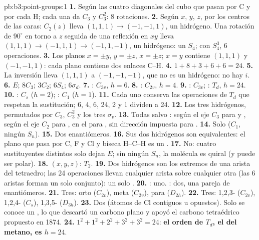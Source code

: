 \begin{solution}{pb:b3:point-groups:1}
\textbf{1.} Según las cuatro diagonales del cubo que pasan por C y por cada H; cada una da
$C_3$ y $C_3^2$: 8 rotaciones.
\textbf{2.} Según $x$, $y$, $z$, por los centros de las caras: $C_2(z)$ lleva $(1,1,1)
\to (-1,-1,1)$, un hidrógeno. Una rotación de $90^\circ$ en torno a $z$ seguida de una
reflexión en $xy$ lleva $(1,1,1) \to (-1,1,1) \to (-1,1,-1)$, un hidrógeno: un
$S_4$; con $S_4^3$, 6 operaciones.
\textbf{3.} Los planos $x = \pm y$, $y = \pm z$, $x = \pm z$; $x = y$ contiene
$(1,1,1)$ y $(-1,-1,1)$: cada plano contiene dos enlaces C--H.
\textbf{4.} $1 + 8 + 3 + 6 + 6 = 24$.
\textbf{5.} La inversión lleva $(1,1,1)$ a $(-1,-1,-1)$, que no es un hidrógeno:
no hay $i$.
\textbf{6.} $E$; $8C_3$; $3C_2$; $6S_4$; $6\sigma_d$.
\textbf{7.} : $C_{3v}$, $h = 6$.
\textbf{8.} : $C_{2v}$, $h = 4$.
\textbf{9.} : $C_{3v}$; : $T_d$, $h = 24$.
\textbf{10.} : $C_s$ ($h = 2$); : $C_1$ ($h = 1$).
\textbf{11.} Cada uno conserva las operaciones de $T_d$ que respetan la
sustitución; 6, 4, 6, 24, 2 y 1 dividen a 24.
\textbf{12.} Los tres hidrógenos, permutados por $C_3$, $C_3^2$ y los tres
$\sigma_v$.
\textbf{13.} Todas salvo : según el eje $C_3$ para  y ,
según el eje $C_2$ para , en el  para , sin
dirección impuesta para .
\textbf{14.} Solo  ($C_1$, ningún $S_n$).
\textbf{15.} Dos enantiómeros.
\textbf{16.} Sus dos hidrógenos son equivalentes: el plano que pasa por C, F y Cl
y biseca H--C--H es un .
\textbf{17.} No: cuatro sustituyentes distintos solo dejan $E$; sin ningún $S_n$, la
molécula es quiral (y puede ser polar).
\textbf{18.} $(x, y, z)$: $T_2$.
\textbf{19.} Dos hidrógenos son los extremos de una arista del tetraedro; las 24
operaciones llevan cualquier arista sobre cualquier otra (las 6 aristas forman un solo conjunto): un solo
.
\textbf{20.} : uno. : dos, una pareja de enantiómeros.
\textbf{21.} Tres: orto ($C_{2v}$), meta ($C_{2v}$), para ($D_{2h}$).
\textbf{22.} Tres: 1,2,3- ($C_{2v}$), 1,2,4- ($C_s$), 1,3,5- ($D_{3h}$).
\textbf{23.} Dos (átomos de Cl contiguos u opuestos). Solo se conoce un ,
lo que descartó un carbono plano y apoyó el carbono tetraédrico
propuesto en 1874.
\textbf{24.} $1^2 + 1^2 + 2^2 + 3^2 + 3^2 = 24$: \textbf{el orden de $T_d$, el
 del metano, es $h = 24$}.
\end{solution}
